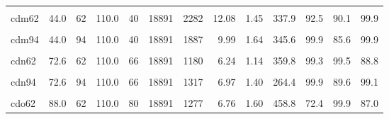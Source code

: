\begin{landscape}
\begin{longtable}[t]{lrrrrrrrrrrrr}
\cellcolor{gray!6}{cdm46} & \cellcolor{gray!6}{44.0} & \cellcolor{gray!6}{46} & \cellcolor{gray!6}{110.0} & \cellcolor{gray!6}{40} & \cellcolor{gray!6}{18891} & \cellcolor{gray!6}{1396} & \cellcolor{gray!6}{7.39} & \cellcolor{gray!6}{1.35} & \cellcolor{gray!6}{368.0} & \cellcolor{gray!6}{91.7} & \cellcolor{gray!6}{94.6} & \cellcolor{gray!6}{82.9}\\
cdm62 & 44.0 & 62 & 110.0 & 40 & 18891 & 2282 & 12.08 & 1.45 & 337.9 & 92.5 & 90.1 & 99.9\\
\cellcolor{gray!6}{cdm78} & \cellcolor{gray!6}{44.0} & \cellcolor{gray!6}{78} & \cellcolor{gray!6}{110.0} & \cellcolor{gray!6}{40} & \cellcolor{gray!6}{18891} & \cellcolor{gray!6}{1670} & \cellcolor{gray!6}{8.84} & \cellcolor{gray!6}{1.52} & \cellcolor{gray!6}{342.0} & \cellcolor{gray!6}{91.3} & \cellcolor{gray!6}{90.9} & \cellcolor{gray!6}{99.9}\\
cdm94 & 44.0 & 94 & 110.0 & 40 & 18891 & 1887 & 9.99 & 1.64 & 345.6 & 99.9 & 85.6 & 99.9\\
\cellcolor{gray!6}{cdn46} & \cellcolor{gray!6}{72.6} & \cellcolor{gray!6}{46} & \cellcolor{gray!6}{110.0} & \cellcolor{gray!6}{66} & \cellcolor{gray!6}{18891} & \cellcolor{gray!6}{1856} & \cellcolor{gray!6}{9.82} & \cellcolor{gray!6}{1.25} & \cellcolor{gray!6}{439.2} & \cellcolor{gray!6}{96.6} & \cellcolor{gray!6}{96.7} & \cellcolor{gray!6}{50.9}\\
cdn62 & 72.6 & 62 & 110.0 & 66 & 18891 & 1180 & 6.24 & 1.14 & 359.8 & 99.3 & 99.5 & 88.8\\
\cellcolor{gray!6}{cdn78} & \cellcolor{gray!6}{72.6} & \cellcolor{gray!6}{78} & \cellcolor{gray!6}{110.0} & \cellcolor{gray!6}{66} & \cellcolor{gray!6}{18891} & \cellcolor{gray!6}{1513} & \cellcolor{gray!6}{8.01} & \cellcolor{gray!6}{1.45} & \cellcolor{gray!6}{319.7} & \cellcolor{gray!6}{99.9} & \cellcolor{gray!6}{85.0} & \cellcolor{gray!6}{98.4}\\
cdn94 & 72.6 & 94 & 110.0 & 66 & 18891 & 1317 & 6.97 & 1.40 & 264.4 & 99.9 & 89.6 & 99.1\\
\cellcolor{gray!6}{cdo46} & \cellcolor{gray!6}{88.0} & \cellcolor{gray!6}{46} & \cellcolor{gray!6}{110.0} & \cellcolor{gray!6}{80} & \cellcolor{gray!6}{18891} & \cellcolor{gray!6}{1456} & \cellcolor{gray!6}{7.71} & \cellcolor{gray!6}{1.28} & \cellcolor{gray!6}{376.1} & \cellcolor{gray!6}{99.5} & \cellcolor{gray!6}{99.0} & \cellcolor{gray!6}{97.8}\\
cdo62 & 88.0 & 62 & 110.0 & 80 & 18891 & 1277 & 6.76 & 1.60 & 458.8 & 72.4 & 99.9 & 87.0\\

\end{longtable}
\end{landscape}
